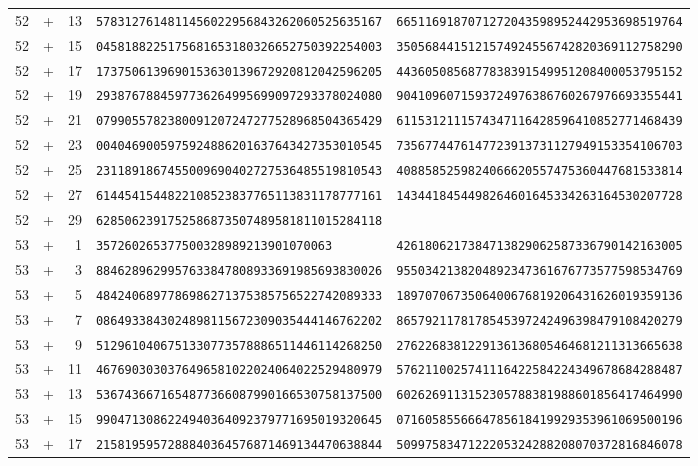 \begin{longtable}{@{}rcrll@{}}
52&+&13&\texttt{5783127614811456022956843262060525635167}&\texttt{6651169187071272043598952442953698519764}\\
52&+&15&\texttt{0458188225175681653180326652750392254003}&\texttt{3505684415121574924556742820369112758290}\\
52&+&17&\texttt{1737506139690153630139672920812042596205}&\texttt{4436050856877838391549951208400053795152}\\
52&+&19&\texttt{2938767884597736264995699097293378024080}&\texttt{9041096071593724976386760267976693355441}\\
52&+&21&\texttt{0799055782380091207247277528968504365429}&\texttt{6115312111574347116428596410852771468439}\\
52&+&23&\texttt{0040469005975924886201637643427353010545}&\texttt{7356774476147723913731127949153354106703}\\
52&+&25&\texttt{2311891867455009690402727536485519810543}&\texttt{4088585259824066620557475360447681533814}\\
52&+&27&\texttt{6144541544822108523837765113831178777161}&\texttt{1434418454498264601645334263164530207728}\\
52&+&29&\texttt{6285062391752586873507489581811015284118}&\texttt{}\\
53&+&1&\texttt{357260265377500328989213901070063}&\texttt{4261806217384713829062587336790142163005}\\
53&+&3&\texttt{8846289629957633847808933691985693830026}&\texttt{9550342138204892347361676773577598534769}\\
53&+&5&\texttt{4842406897786986271375385756522742089333}&\texttt{1897070673506400676819206431626019359136}\\
53&+&7&\texttt{0864933843024898115672309035444146762202}&\texttt{8657921178178545397242496398479108420279}\\
53&+&9&\texttt{5129610406751330773578886511446114268250}&\texttt{2762268381229136136805464681211313665638}\\
53&+&11&\texttt{4676903030376496581022024064022529480979}&\texttt{5762110025741116422584224349678684288487}\\
53&+&13&\texttt{5367436671654877366087990166530758137500}&\texttt{6026269113152305788381988601856417464990}\\
53&+&15&\texttt{9904713086224940364092379771695019320645}&\texttt{0716058556664785618419929353961069500196}\\
53&+&17&\texttt{2158195957288840364576871469134470638844}&\texttt{5099758347122205324288208070372816846078}\\

\end{longtable}
